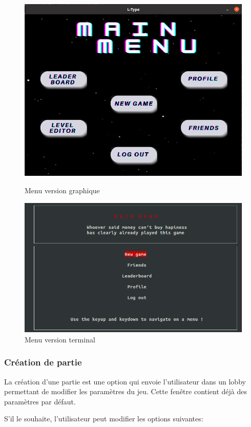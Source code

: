 \documentclass[a4paper,12pt]{article}
\begin{document}
\begin{figure}[hbtp]
    \centering
    \includegraphics[scale=0.5]{images/menuGui.png}
    \caption{Menu version graphique }
    
    \includegraphics[scale=0.5]{images/menuTerm.png}
    \caption{Menu version terminal}
\end{figure}

\newpage

\subsubsection{Création de partie}
La création d'une partie est une option qui envoie l'utilisateur dans un lobby permettant de modifier les paramètres du jeu.
Cette fenêtre contient déjà des paramètres par défaut.

S'il le souhaite, l'utilisateur peut modifier les options suivantes:
\end{document}
